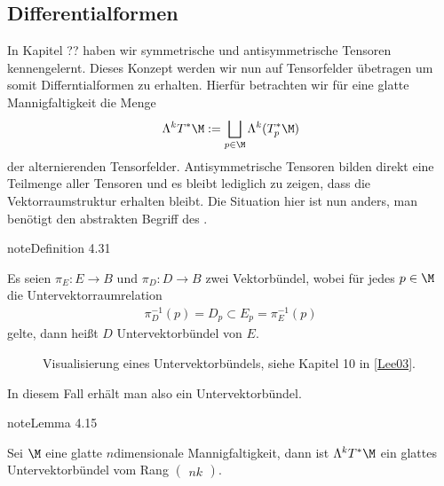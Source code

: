 \documentclass[letterpaper,10pt,german]{jupyterBook}
\let\sphinxpxdimen\pdfpxdimen\else\newdimen\sphinxpxdimen
\begin{document}
\subsection{Differentialformen}
\label{\detokenize{manifolds/diffformen:differentialformen}}\label{\detokenize{manifolds/diffformen:s-difformen}}
\sphinxAtStartPar
In Kapitel ?? haben wir symmetrische und antisymmetrische Tensoren kennengelernt. Dieses Konzept werden wir nun auf Tensorfelder übetragen um somit Differntialformen zu erhalten. Hierfür betrachten wir für eine glatte Mannigfaltigkeit die Menge
\begin{equation*}
\begin{split}\Lambda^k T^\ast\M := \bigsqcup_{p\in\M} \Lambda^k (T^\ast_p\M)\end{split}
\end{equation*}
\sphinxAtStartPar
der alternierenden Tensorfelder. Antisymmetrische Tensoren bilden direkt eine Teilmenge aller Tensoren und es bleibt lediglich zu zeigen, dass die Vektorraumstruktur erhalten bleibt. Die Situation hier ist nun anders, man benötigt den abstrakten Begriff des .
\label{manifolds/diffformen:definition-0}
\begin{sphinxadmonition}{note}{Definition 4.31}



\sphinxAtStartPar
Es seien \(\pi_E:E\to B\) und \(\pi_D:D\to B\) zwei Vektorbündel, wobei für jedes \(p\in\M\) die Untervektorraumrelation
\begin{equation*}
\begin{split}\pi_D^{-1}(p) = D_p\subset E_p = \pi_E^{-1}(p)\end{split}
\end{equation*}
\sphinxAtStartPar
gelte, dann heißt \(D\) Untervektorbündel von \(E\).
\end{sphinxadmonition}

\begin{figure}[htbp]
\centering
\capstart

\noindent\sphinxincludegraphics[height=300\sphinxpxdimen]{{subbundle}.png}
\caption{Visualisierung eines Untervektorbündels, siehe Kapitel 10 in {[}\hyperlink{cite.references:id18}{Lee03}{]}.}\label{\detokenize{manifolds/diffformen:fig-subbundle}}\end{figure}

\sphinxAtStartPar
In diesem Fall erhält man also ein Untervektorbündel.
\label{manifolds/diffformen:lemma-1}
\begin{sphinxadmonition}{note}{Lemma 4.15}



\sphinxAtStartPar
Sei \(\M\) eine glatte \(n\)\sphinxhyphen{}dimensionale Mannigfaltigkeit, dann ist \(\Lambda^k T^\ast\M\) ein glattes Untervektorbündel vom Rang \(\begin{pmatrix} n k \end{pmatrix}\).
\end{sphinxadmonition}
\end{document}
